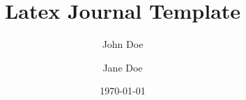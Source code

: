 \documentclass[10pt, letterpaper, twocolumn]{article}
\title{Latex Journal Template}
\author[1]{John Doe}
\author[1]{Jane Doe}
\affil[1]{Institution}
\date{\today}
\renewenvironment{abstract}{\bfseries\textit{\abstractname}--- \relax}  %
\begin{document}
\maketitle

\begin{abstract}\end{abstract}

\section{Introduction}
\label{sec:introduction}


\section{Theory}
\label{sec:theory}


\section{Methods}
\label{sec:methods}


\section{Results}
\label{sec:results}


\section{Conclusion}
\label{sec:conclusion}




\onecolumn
\begin{appendices}

\section{Appendix A}
\label{app:appendix_a}


\end{appendices}
\end{document}
